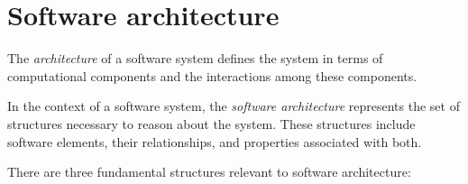 \documentclass[12pt, a4paper]{report}
\begin{document}
    \section{Software architecture}
        \begin{definition}
            The \emph{architecture} of a software system defines the system in terms of computational components and the interactions among these components.

            In the context of a software system, the \emph{software architecture} represents the set of structures necessary to reason about the system. 
            These structures include software elements, their relationships, and properties associated with both.
        \end{definition}
        There are three fundamental structures relevant to software architecture:
\end{document}
